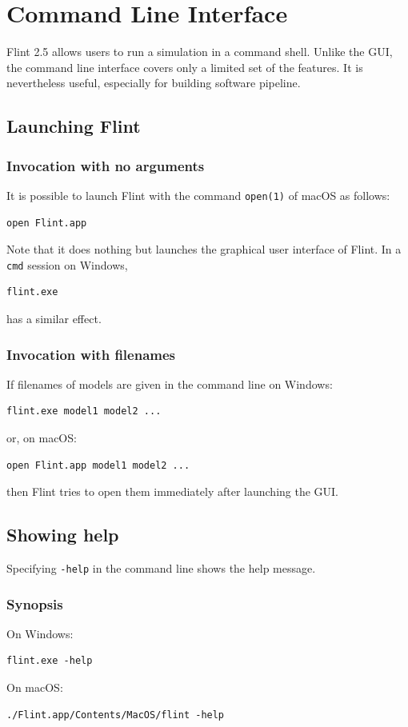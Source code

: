 \documentclass[a4paper,10pt]{report}
\begin{document}
\chapter{Command Line Interface}
\label{sec:orgc6462c9}
Flint 2.5 allows users to run a simulation in a command shell.
Unlike the GUI, the command line interface covers only a limited set of
the features. It is nevertheless useful, especially for building software pipeline.

\section{Launching Flint}
\label{sec:org8217fcc}

\subsection{Invocation with no arguments}
\label{sec:org1d512ed}
It is possible to launch Flint with the command \texttt{open(1)} of macOS as follows:
\begin{verbatim}
open Flint.app
\end{verbatim}
Note that it does nothing but launches the graphical user interface of Flint.
In a \texttt{cmd} session on Windows,
\begin{verbatim}
flint.exe
\end{verbatim}
has a similar effect.

\subsection{Invocation with filenames}
\label{sec:orga1fd641}
If filenames of models are given in the command line on Windows:
\begin{verbatim}
flint.exe model1 model2 ...
\end{verbatim}
or, on macOS:
\begin{verbatim}
open Flint.app model1 model2 ...
\end{verbatim}
then Flint tries to open them immediately after launching the GUI.

\section{Showing help}
\label{sec:org2263126}
Specifying \texttt{-help} in the command line shows the help message.

\subsection{Synopsis}
\label{sec:orga2d1dde}
On Windows:
\begin{verbatim}
flint.exe -help
\end{verbatim}
On macOS:
\begin{verbatim}
./Flint.app/Contents/MacOS/flint -help
\end{verbatim}
\end{document}
